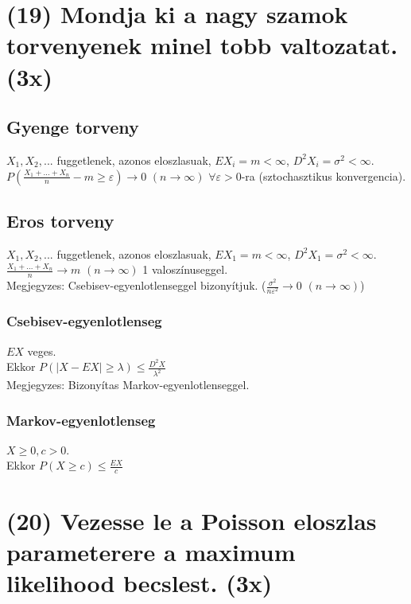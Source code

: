 \documentclass[12p]{article}
\begin{document}
\section{(19) Mondja ki a nagy szamok torvenyenek minel tobb valtozatat. (3x)}

	\subsection{Gyenge torveny}
	
	$X_1, X_2, ...$ fuggetlenek, azonos eloszlasuak, $EX_i = m < \infty$, $D^{2}X_i = \sigma^2 < \infty$. \\
	$P(\frac{X_1 + ... + X_n}{n} - m \geq \varepsilon) \rightarrow 0$ $(n \to \infty)$ $\forall \varepsilon > 0$-ra (sztochasztikus konvergencia).
	
	\subsection{Eros torveny}
	
	$X_1, X_2, ...$ fuggetlenek, azonos eloszlasuak, $EX_1 = m < \infty$, $D^{2}X_1 = \sigma^2 < \infty$. \\
	$\frac{X_1 + ... + X_n}{n} \rightarrow m$ $(n \to \infty)$ 1 valoszínuseggel. \\
	Megjegyzes: Csebisev-egyenlotlenseggel bizonyítjuk. ($\frac{\sigma^2}{n \varepsilon^2} \to 0$ $(n \to \infty)$)
	
	\subsubsection{Csebisev-egyenlotlenseg}
	
	$EX$ veges. \\
	Ekkor $P(|X-EX| \geq \lambda) \leq \frac{D^{2}X}{\lambda^2}$ \\
	Megjegyzes: Bizonyítas Markov-egyenlotlenseggel.
	
	\subsubsection{Markov-egyenlotlenseg}
	
	$X \geq 0, c > 0$. \\
	Ekkor $P(X \geq c) \leq \frac{EX}{c}$
	


\section{(20) Vezesse le a Poisson eloszlas parameterere a maximum likelihood becslest. (3x)}
\end{document}

